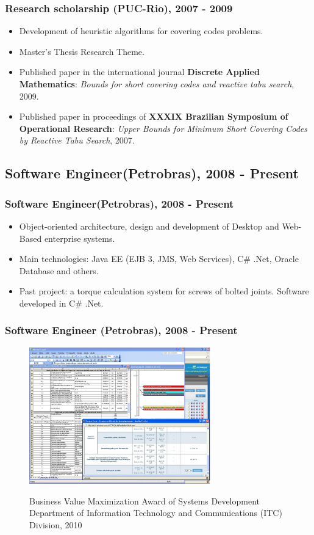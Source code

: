 \documentclass{beamer}
\begin{document}
\begin{frame}
	\frametitle{Research scholarship (PUC-Rio), 2007 - 2009}
{
	\begin{itemize}
	  \item<1-> Development of heuristic algorithms for covering codes problems.
	  \item<2-> Master's Thesis Research Theme.  
	  \item<3-> Published paper in the international journal \textbf{Discrete
	  Applied Mathematics}: \textit{Bounds for short covering codes and reactive tabu search}, 2009.	  
	  \item<4-> Published paper in proceedings of \textbf{XXXIX Brazilian
	  Symposium of Operational Research}: \textit{Upper Bounds for Minimum Short 
Covering Codes by Reactive Tabu Search}, 2007.	  	    	  
	\end{itemize}
}
\end{frame}

\subsection{Software Engineer(Petrobras), 2008 - Present}

\begin{frame}
	\frametitle{Software Engineer(Petrobras), 2008 - Present}
{
	\begin{itemize}
	  \item<1->Object-oriented architecture, design and development of Desktop and
	  Web-Based enterprise systems.
	  \item<2->Main technologies: Java EE (EJB 3, JMS, Web Services), C\# .Net,
	  Oracle Database and others.
	  \item<3->Past project: a torque calculation system for screws of bolted
	  joints. Software developed in C\# .Net.
	\end{itemize}		 
}
\end{frame}

\begin{frame}
	\frametitle{Software Engineer (Petrobras), 2008 - Present}
{	 
	\begin{figure}[htbp]			
		\centering
		\includegraphics[width=0.70\textwidth]{images/ccta.JPG}
		\label{fig:ccta}
		\caption{\small{Business Value Maximization Award of Systems Development
		Department of Information Technology and Communications (ITC) Division, 2010}}							
	\end{figure}
}
\end{frame}
\end{document}
